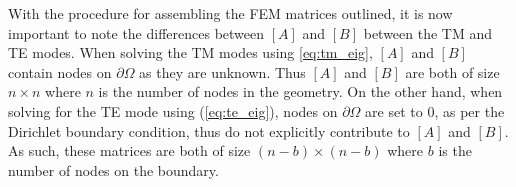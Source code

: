 With the procedure for assembling the FEM matrices outlined, it is now important to note the differences between $[A]$ and $[B]$ between the TM and TE modes. When solving the TM modes using \ref{eq:tm_eig}, $[A]$ and $[B]$ contain nodes on $\partial\Omega$ as they are unknown. Thus $[A]$ and $[B]$ are both of size $n\times n$ where $n$ is the number of nodes in the geometry. On the other hand, when solving for the TE mode using (\ref{eq:te_eig}), nodes on $\partial\Omega$ are set to $0$, as per the Dirichlet boundary condition, thus do not explicitly contribute to $[A]$ and $[B]$. As such, these matrices are both of size $(n-b)\times(n-b)$ where $b$ is the number of nodes on the boundary.